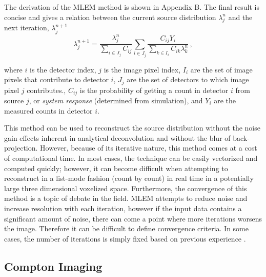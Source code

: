 \documentclass[10pt]{article}
\begin{document}
The derivation of the MLEM method is shown in Appendix B. The final result is concise and gives a relation between the current source distribution $\lambda_j^n$ and the next iteration, $\lambda_j^{n+1}$
%
 \begin{equation}
	\lambda_j^{n+1} = \frac{\lambda_j^n}{\sum\limits_{i \in J_j}C_{ij}} \sum_{i \in J_j} \frac{C_{ij}Y_i}{\sum\limits_{k \in I_i}C_{ik}\lambda_k^n}\,,
\end{equation}

\noindent where $i$ is the detector index, $j$ is the image pixel index, $I_i$ are the set of image pixels that contribute to detector $i$, $J_j$ are the set of detectors to which image pixel $j$ contributes., $C_{ij}$ is the probability of getting a count in detector $i$ from source $j$, or \emph{system response} (determined from simulation), and $Y_{i}$ are the measured counts in detector $i$.

This method can be used to reconstruct the source distribution without the noise gain effects inherent in analytical deconvolution and without the blur of back-projection. However, because of its iterative nature, this method comes at a cost of computational time. In most cases, the technique can be easily vectorized and computed quickly; however, it can become difficult when attempting to reconstruct in a list-mode fashion (count by count) in real time in a potentially large three dimensional voxelized space. Furthermore, the convergence of this method is a topic of debate in the field. MLEM attempts to reduce noise and increase resolution with each iteration, however if the input data contains a significant amount of noise, there can come a point where more iterations worsens the image. Therefore it can be difficult to define convergence criteria. In some cases, the number of iterations is simply fixed based on previous experience \cite{SheppVardi1982, Bissantz2006}.



\subsection{Compton Imaging}
\end{document}

